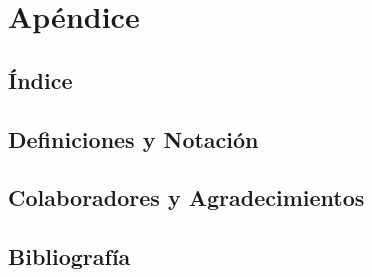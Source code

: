 
\chapter{Apéndice}

    \section{Índice}

    \section{Definiciones y Notación}

    \section{Colaboradores y Agradecimientos}

    \section{Bibliografía}